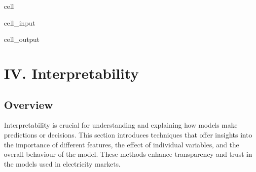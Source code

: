 \documentclass[letterpaper,10pt,english]{jupyterBook}
\begin{document}
\begin{sphinxuseclass}{cell}
\begin{sphinxVerbatimInput}
\begin{sphinxuseclass}{cell_input}
\begin{sphinxVerbatim}[commandchars=\\\{\}]
\end{sphinxVerbatim}

\end{sphinxuseclass}\end{sphinxVerbatimInput}
\begin{sphinxVerbatimOutput}

\begin{sphinxuseclass}{cell_output}
\noindent{}

\end{sphinxuseclass}\end{sphinxVerbatimOutput}

\end{sphinxuseclass}
\sphinxstepscope


\part{IV. Interpretability}

\sphinxstepscope


\chapter{Overview}
\label{\detokenize{notebooks/preface_interpretability:overview}}\label{\detokenize{notebooks/preface_interpretability::doc}}
\sphinxAtStartPar
Interpretability is crucial for understanding and explaining how models make predictions or decisions. This section introduces techniques that offer insights into the importance of different features, the effect of individual variables, and the overall behaviour of the model. These methods enhance transparency and trust in the models used in electricity markets.
\end{document}
